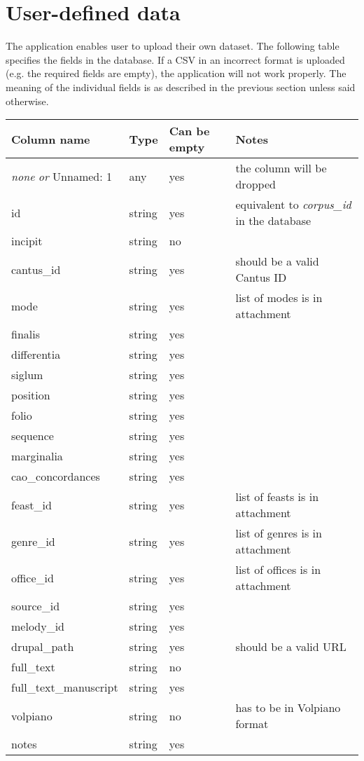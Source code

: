 \section{User-defined data}

The application enables user to upload their own dataset. The following table specifies the fields in the database. If a CSV in an
incorrect format is uploaded (e.g. the required fields are empty), the application will not work properly. The meaning of the individual
fields is as described in the previous section unless said otherwise.

\begin{longtable}{| p{} | p{} | p{} | p{} |} 

 \hline
 Column name     & Type  & Can be empty  & Notes \\
 \hline
 \emph{none} \emph{or} Unnamed: 1 & any & yes & the column will be dropped  \\ \hline
 id             & string & yes & equivalent to \emph{corpus\_id} in the database \\ \hline
 incipit        & string & no  & \\ \hline
 cantus\_id     & string & yes & should be a valid Cantus ID \\ \hline
 mode           & string & yes & list of modes is in attachment \\ \hline
 finalis        & string & yes & \\ \hline
 differentia    & string & yes & \\ \hline
 siglum         & string & yes & \\ \hline
 position       & string & yes & \\ \hline
 folio          & string & yes & \\ \hline
 sequence       & string & yes & \\ \hline
 marginalia     & string & yes & \\ \hline
 cao\_concordances & string & yes & \\ \hline
 feast\_id      & string & yes & list of feasts is in attachment \\ \hline
 genre\_id      & string & yes & list of genres is in attachment \\ \hline
 office\_id     & string & yes & list of offices is in attachment \\ \hline
 source\_id     & string & yes & \\ \hline
 melody\_id     & string & yes & \\ \hline
 drupal\_path   & string & yes & should be a valid URL \\ \hline
 full\_text     & string & no  & \\ \hline
 full\_text\_manuscript & string & yes & \\ \hline
 volpiano       & string & no  & has to be in Volpiano format \\ \hline
 notes          & string & yes & \\
 \hline


\end{longtable}

